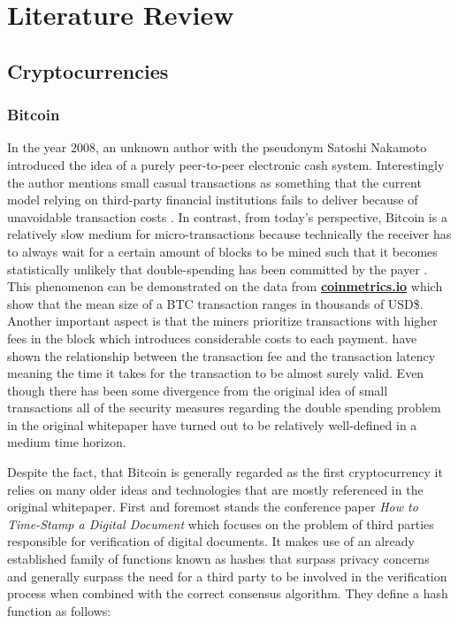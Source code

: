 \chapter{Literature Review}
\label{chap:two}


\section{Cryptocurrencies}
\label{sec:crypto}

\subsection{Bitcoin}
In the year 2008, an unknown author with the pseudonym Satoshi Nakamoto introduced the idea of 
a purely peer-to-peer electronic cash system. Interestingly the author mentions 
small casual transactions as something that the current model relying on third-party
financial institutions fails to deliver because of unavoidable transaction costs \cite{Nakamoto2008}. 
In contrast, from today's perspective, Bitcoin is a relatively slow medium for micro-transactions because 
technically the receiver has to always wait for a certain amount of blocks to be mined such that
it becomes statistically unlikely that double-spending has been committed by the payer 
\cite{Conti2018}. This phenomenon
can be demonstrated on the data from \textbf{\href{https://coinmetrics.io/}{coinmetrics.io}} which show
that the mean size of a \ac{BTC} transaction ranges in thousands of USD\$. 
Another important aspect is that 
the miners prioritize transactions with higher fees in the block which introduces considerable costs
to each payment. \cite{Moeser2015} have shown the relationship between the transaction fee 
and the transaction latency meaning the time it takes for the transaction to be almost surely valid.
Even though 
there has been some divergence from the original idea of small transactions all of the security measures
regarding the double spending problem in the original whitepaper have turned out to be relatively 
well-defined in a medium time horizon.


Despite the fact, that Bitcoin is generally regarded as the first cryptocurrency it relies on 
many older ideas and technologies that are mostly referenced in the original whitepaper. First and foremost
stands the conference paper \textit{How to Time-Stamp a Digital Document} \cite{Haber1991} which focuses
on the problem of third parties responsible for verification of digital documents. It makes use of 
an already established family of functions known as hashes that surpass privacy concerns and generally
surpass the need for a third party to be involved in the verification process when combined
with the correct consensus algorithm. They define a hash function as follows:

